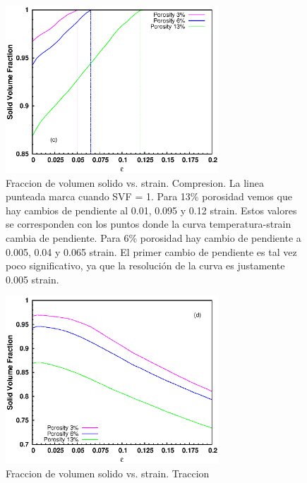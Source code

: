 \documentclass[10pt, oneside]{article} %
\begin{document}
\begin{figure}[H]
\centering
\includegraphics[width=8cm]{Figures/Porosidad/porosity_SVF_strain_comp_dash.eps}
\caption{Fraccion de volumen solido vs. strain. Compresion. La linea punteada marca cuando SVF = 1. Para 13\% porosidad vemos que hay cambios de pendiente al 0.01, 0.095 y 0.12 strain. Estos valores se corresponden con los puntos donde la curva temperatura-strain cambia de pendiente. Para 6\% porosidad hay cambio de pendiente a 0.005, 0.04 y 0.065 strain. El primer cambio de pendiente es tal vez poco significativo, ya que la resolución de la curva es justamente 0.005 strain. }
\end{figure}


\begin{figure}[H]
\centering
\includegraphics[width=8cm]{Figures/Porosidad/porosity_SVF_strain_tens.eps}
\caption{Fraccion de volumen solido vs. strain. Traccion}
\end{figure}

\end{document}
